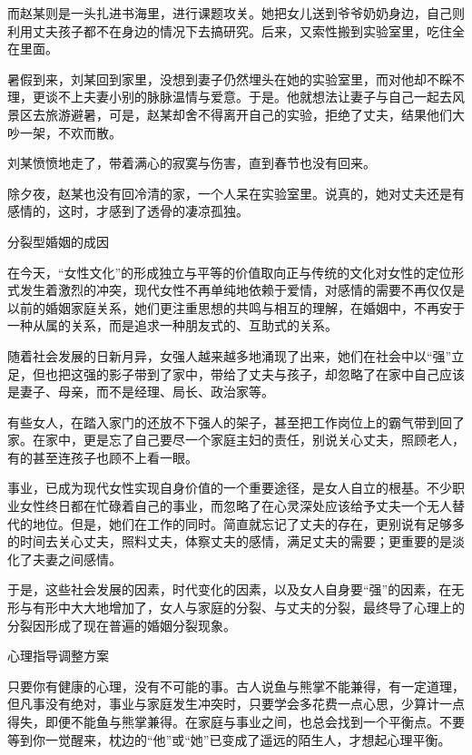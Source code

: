 \documentclass[12pt,UTF8,openany]{ctexbook}
\begin{document}
而赵某则是一头扎进书海里，进行课题攻关。她把女儿送到爷爷奶奶身边，自己则利用丈夫孩子都不在身边的情况下去搞研究。后来，又索性搬到实验室里，吃住全在里面。

暑假到来，刘某回到家里，没想到妻子仍然埋头在她的实验室里，而对他却不睬不理，更谈不上夫妻小别的脉脉温情与爱意。于是。他就想法让妻子与自己一起去风景区去旅游避暑，可是，赵某却舍不得离开自己的实验，拒绝了丈夫，结果他们大吵一架，不欢而散。

刘某愤愤地走了，带着满心的寂寞与伤害，直到春节也没有回来。

除夕夜，赵某也没有回冷清的家，一个人呆在实验室里。说真的，她对丈夫还是有感情的，这时，才感到了透骨的凄凉孤独。





分裂型婚姻的成因


在今天，“女性文化”的形成独立与平等的价值取向正与传统的文化对女性的定位形式发生着激烈的冲突，现代女性不再单纯地依赖于爱情，对感情的需要不再仅仅是以前的婚姻家庭关系，她们更注重思想的共鸣与相互的理解，在婚姻中，不再安于一种从属的关系，而是追求一种朋友式的、互助式的关系。

随着社会发展的日新月异，女强人越来越多地涌现了出来，她们在社会中以“强”立足，但也把这强的影子带到了家中，带给了丈夫与孩子，却忽略了在家中自己应该是妻子、母亲，而不是经理、局长、政治家等。

有些女人，在踏入家门的还放不下强人的架子，甚至把工作岗位上的霸气带到回了家。在家中，更是忘了自己要尽一个家庭主妇的责任，别说关心丈夫，照顾老人，有的甚至连孩子也顾不上看一眼。

事业，已成为现代女性实现自身价值的一个重要途径，是女人自立的根基。不少职业女性终日都在忙碌着自己的事业，而忽略了在心灵深处应该给予丈夫一个无人替代的地位。但是，她们在工作的同时。简直就忘记了丈夫的存在，更别说有足够多的时间去关心丈夫，照料丈夫，体察丈夫的感情，满足丈夫的需要；更重要的是淡化了夫妻之间感情。

于是，这些社会发展的因素，时代变化的因素，以及女人自身要“强”的因素，在无形与有形中大大地增加了，女人与家庭的分裂、与丈夫的分裂，最终导了心理上的分裂因形成了现在普遍的婚姻分裂现象。





心理指导调整方案


只要你有健康的心理，没有不可能的事。古人说鱼与熊掌不能兼得，有一定道理，但凡事没有绝对，事业与家庭发生冲突时，只要学会多花费一点心思，少算计一点得失，即便不能鱼与熊掌兼得。在家庭与事业之间，也总会找到一个平衡点。不要等到你一觉醒来，枕边的“他”或“她”已变成了遥远的陌生人，才想起心理平衡。
\end{document}
